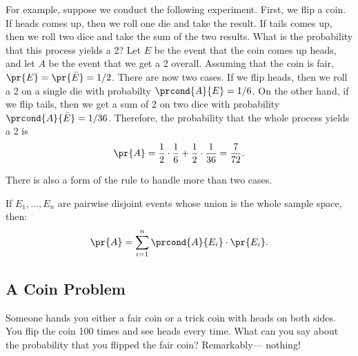 For example, suppose we conduct the following experiment.  First, we flip a
coin.  If heads comes up, then we roll one die and take the result.  If
tails comes up, then we roll two dice and take the sum of the two results.
What is the probability that this process yields a 2?  Let $E$ be the
event that the coin comes up heads, and let $A$ be the event that we get a
2 overall.  Assuming that the coin is fair, $\pr{E} = \pr{\bar{E}} = 1/2$.
There are now two cases. If we flip heads, then we roll a 2 on a single
die with probabilty $\prcond{A}{E} = 1/6$.  On the other hand, if we flip
tails, then we get a sum of 2 on two dice with probability
$\prcond{A}{\bar{E}} = 1/36$.  Therefore, the probability that the whole
process yields a 2 is
\[
\pr{A} = \frac{1}{2} \cdot \frac{1}{6} + \frac{1}{2} \cdot \frac{1}{36} =
  \frac{7}{72}.
\]

There is also a form of the rule to handle more than two cases.
\begin{rul*}
If $E_1, \dots, E_n$ are pairwise disjoint events whose
union is the whole sample space, then:
\[
\pr{A} = \sum_{i=1}^{n} \prcond{A}{E_i} \cdot \pr{E_i}.
\]

\end{rul*}


\iffalse
\subsection{A Coin Problem}
Someone hands you either a fair coin or a trick coin with heads on both
sides.  You flip the coin 100 times and see heads every time.  What can
you say about the probability that you flipped the fair coin?
Remarkably--- nothing!

